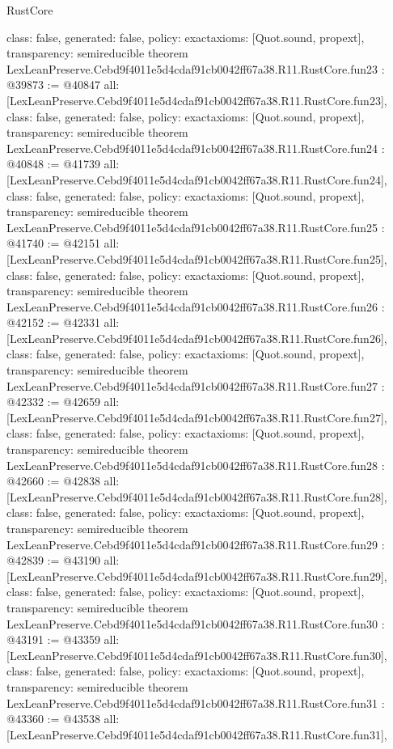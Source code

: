 \begin{lexlean}{RustCore}
\begin{coremodule}
{  class: false,
  generated: false,
  policy: exact{axioms: [Quot.sound, propext]},
  transparency: semireducible
}
theorem LexLeanPreserve.Cebd9f4011e5d4cdaf91cb0042ff67a38.R11.RustCore.fun23 : @39873 := @40847 {
  all: [LexLeanPreserve.Cebd9f4011e5d4cdaf91cb0042ff67a38.R11.RustCore.fun23],
  class: false,
  generated: false,
  policy: exact{axioms: [Quot.sound, propext]},
  transparency: semireducible
}
theorem LexLeanPreserve.Cebd9f4011e5d4cdaf91cb0042ff67a38.R11.RustCore.fun24 : @40848 := @41739 {
  all: [LexLeanPreserve.Cebd9f4011e5d4cdaf91cb0042ff67a38.R11.RustCore.fun24],
  class: false,
  generated: false,
  policy: exact{axioms: [Quot.sound, propext]},
  transparency: semireducible
}
theorem LexLeanPreserve.Cebd9f4011e5d4cdaf91cb0042ff67a38.R11.RustCore.fun25 : @41740 := @42151 {
  all: [LexLeanPreserve.Cebd9f4011e5d4cdaf91cb0042ff67a38.R11.RustCore.fun25],
  class: false,
  generated: false,
  policy: exact{axioms: [Quot.sound, propext]},
  transparency: semireducible
}
theorem LexLeanPreserve.Cebd9f4011e5d4cdaf91cb0042ff67a38.R11.RustCore.fun26 : @42152 := @42331 {
  all: [LexLeanPreserve.Cebd9f4011e5d4cdaf91cb0042ff67a38.R11.RustCore.fun26],
  class: false,
  generated: false,
  policy: exact{axioms: [Quot.sound, propext]},
  transparency: semireducible
}
theorem LexLeanPreserve.Cebd9f4011e5d4cdaf91cb0042ff67a38.R11.RustCore.fun27 : @42332 := @42659 {
  all: [LexLeanPreserve.Cebd9f4011e5d4cdaf91cb0042ff67a38.R11.RustCore.fun27],
  class: false,
  generated: false,
  policy: exact{axioms: [Quot.sound, propext]},
  transparency: semireducible
}
theorem LexLeanPreserve.Cebd9f4011e5d4cdaf91cb0042ff67a38.R11.RustCore.fun28 : @42660 := @42838 {
  all: [LexLeanPreserve.Cebd9f4011e5d4cdaf91cb0042ff67a38.R11.RustCore.fun28],
  class: false,
  generated: false,
  policy: exact{axioms: [Quot.sound, propext]},
  transparency: semireducible
}
theorem LexLeanPreserve.Cebd9f4011e5d4cdaf91cb0042ff67a38.R11.RustCore.fun29 : @42839 := @43190 {
  all: [LexLeanPreserve.Cebd9f4011e5d4cdaf91cb0042ff67a38.R11.RustCore.fun29],
  class: false,
  generated: false,
  policy: exact{axioms: [Quot.sound, propext]},
  transparency: semireducible
}
theorem LexLeanPreserve.Cebd9f4011e5d4cdaf91cb0042ff67a38.R11.RustCore.fun30 : @43191 := @43359 {
  all: [LexLeanPreserve.Cebd9f4011e5d4cdaf91cb0042ff67a38.R11.RustCore.fun30],
  class: false,
  generated: false,
  policy: exact{axioms: [Quot.sound, propext]},
  transparency: semireducible
}
theorem LexLeanPreserve.Cebd9f4011e5d4cdaf91cb0042ff67a38.R11.RustCore.fun31 : @43360 := @43538 {
  all: [LexLeanPreserve.Cebd9f4011e5d4cdaf91cb0042ff67a38.R11.RustCore.fun31],
}
\end{coremodule}
\end{lexlean}
